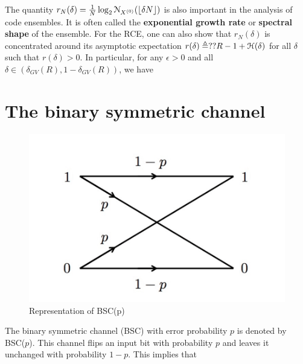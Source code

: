 \documentclass[letterpaper,english,10pt]{article}
\begin{document}
The quantity $r_N(\delta) = \frac{1}{N}\log_2\mathcal{N}_{X^{(0)}}(\lfloor\delta N\rfloor)$ is also important in the analysis of code ensembles. 
It is often called the \textbf{exponential growth rate} or \textbf{spectral shape} of the ensemble. 
For the RCE, one can also show that $r_N(\delta)$ is concentrated around its asymptotic expectation $r(\delta) \triangleq ?? R-1+\mathcal{H}(\delta)$ for all $\delta$ such that $r(\delta) > 0$. 
In particular, for any $\epsilon > 0$ and all $\delta \in (\delta_{GV}(R), 1 - \delta_{GV}(R))$, we have
\section{The binary symmetric channel}
\begin{figure}[h!]
    \centering
    \includegraphics[scale=0.4]{Lectures/2019/Figures/bscp.png}
    \caption{Representation of BSC(p)}
    \label{fig:my_label}
\end{figure}
\flushleft The binary symmetric channel (BSC) with error probability $p$ is denoted by BSC($p$). 
This channel flips an input bit with probability $p$ and leaves it unchanged with probability $1 - p$. 
This implies that 
\end{document}
